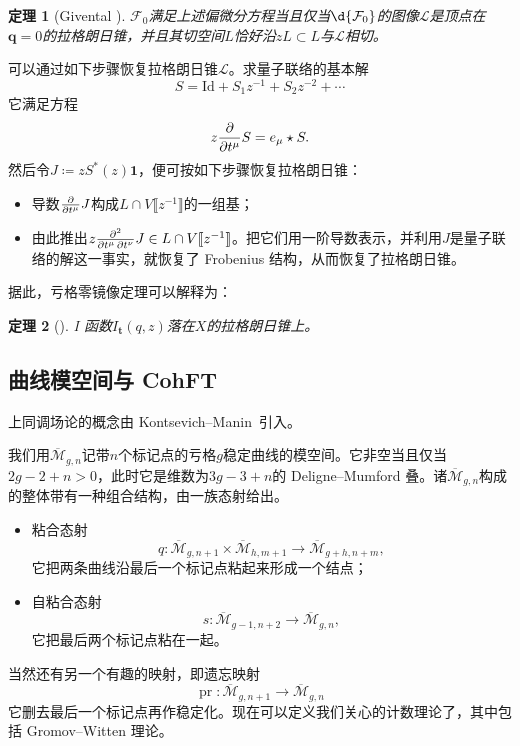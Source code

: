 \documentclass{amsart}
\newtheorem{thm}{定理}[section]
\theoremstyle{definition}
\theoremstyle{remark}
\theoremstyle{plain}
\theoremstyle{definition}
\theoremstyle{remark}
\newcommand{\Mbar}{\overline{\mathcal{M}}}
\newcommand{\mc}[1]{\mathcal{#1}}
\newcommand{\mbf}[1]{\mathbf{#1}}
\newcommand{\bq}{\mbf{q}}
\newcommand{\mr}[1]{\mathrm{#1}}
\newcommand{\1}{\mathbf{1}}
\newcommand{\2}{\mathbf{2}}
\newcommand{\3}{\mathbf{3}}
\newcommand{\ps}[1]{\llbracket #1 \rrbracket}
\DeclareMathOperator{\pr}{pr}
\begin{document}
\begin{thm}[Givental {\cite{Givental2004}}]
    $\mc{F}_0$满足上述偏微分方程当且仅当$\d{\mc{F}_0}$的图像$\mc{L}$是顶点在$\bq = 0$的拉格朗日锥，并且其切空间$L$恰好沿$zL \subset L$与$\mc{L}$相切。
\end{thm}

可以通过如下步骤恢复拉格朗日锥$\mc{L}$。求量子联络的基本解
\[ S = \mr{Id} + S_1 z^{-1} + S_2 z^{-2} + \cdots \]
它满足方程
\[ z \pdv{}{t^{\mu}}S = e_{\mu} \star S. \]
然后令$J \coloneqq z S^*(z) \1$，便可按如下步骤恢复拉格朗日锥：
\begin{itemize}
    \item 导数$\pdv{}{t^{\mu}} J$构成$L \cap V\ps{z^{-1}}$的一组基；
    \item 由此推出$z \pdv{}{t^{\mu},t^{\nu}} J \in L \cap V \ps{z^{-1}}$。把它们用一阶导数表示，并利用$J$是量子联络的解这一事实，就恢复了 Frobenius 结构，从而恢复了拉格朗日锥。
\end{itemize}

据此，亏格零镜像定理可以解释为：
\begin{thm}[{\cite{Givental1998}}]
    I 函数\(I_{\mbf{t}}(q,z)\)落在\(X\)的拉格朗日锥上。
\end{thm}




\subsection{曲线模空间与 CohFT}%
\label{sub:Moduli of curves and CohFTs}

上同调场论的概念由 Kontsevich--Manin~\cite{KM1994}引入。

我们用$\Mbar_{g,n}$记带$n$个标记点的亏格$g$稳定曲线的模空间。它非空当且仅当$2g-2+n > 0$，此时它是维数为$3g-3+n$的 Deligne--Mumford 叠。诸$\Mbar_{g,n}$构成的整体带有一种组合结构，由一族态射给出。
\begin{itemize}
    \item 粘合态射
        \[q \colon \Mbar_{g,n+1} \times \Mbar_{h, m+1} \to \Mbar_{g+h,n+m}, \] 
        它把两条曲线沿最后一个标记点粘起来形成一个结点；
    \item 自粘合态射\[s \colon \Mbar_{g-1,n+2} \to \Mbar_{g,n},\] 
        它把最后两个标记点粘在一起。
\end{itemize}
当然还有另一个有趣的映射，即遗忘映射
\[ \pr \colon \Mbar_{g,n+1} \to \Mbar_{g,n} \]
它删去最后一个标记点再作稳定化。现在可以定义我们关心的计数理论了，其中包括 Gromov--Witten 理论。
\end{document}
